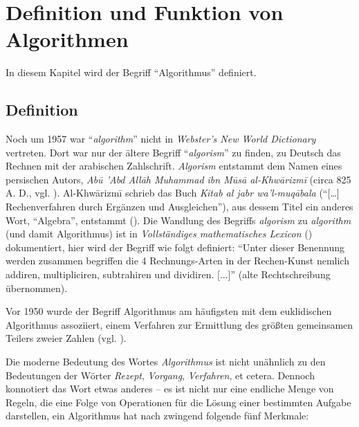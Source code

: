 \chapter{Definition und Funktion von Algorithmen}

In diesem Kapitel wird der Begriff \enquote{Algorithmus} definiert.

\section{Definition}
\label{sec:algorithm-definition}

Noch um 1957 war \enquote{\emph{algorithm}} nicht in \emph{Webster's New World Dictionary} vertreten. Dort war nur der ältere Begriff \enquote{\emph{algorism}} zu finden, zu Deutsch das Rechnen mit der arabischen Zahlschrift. \emph{Algorism} entstammt dem Namen eines persischen Autors, \emph{Abū 'Abd Allāh Muhammad ibn Mūsā al-Khwārizmī} \footnotemark (circa 825 A. D., vgl. \cite[1--2]{taocp1}). Al-Khwārizmī schrieb das Buch \emph{Kitab al jabr wa'l-muqābala} (\enquote{[\ldots] Rechenverfahren durch Ergänzen und Ausgleichen}), aus dessem Titel ein anderes Wort, \enquote{Algebra}, entstammt (\cite[197--199]{ger1984}). Die Wandlung des Begriffs \emph{algorism} zu \emph{algorithm} (und damit Algorithmus) ist in \emph{Vollständiges mathematisches Lexicon} (\cite[38]{wol1747}) dokumentiert, hier wird der Begriff wie folgt definiert: \enquote{Unter dieser Benennung werden zusammen begriffen die 4 Rechnungs-Arten in der Rechen-Kunst nemlich addiren, multipliciren, subtrahiren und dividiren. [...]} (alte Rechtschreibung übernommen).


Vor 1950 wurde der Begriff Algorithmus am häufigsten mit dem euklidischen Algorithmus assoziiert, einem Verfahren zur Ermittlung des größten gemeinsamen Teilers zweier Zahlen (vgl. \cite[2]{taocp1}).

Die moderne Bedeutung des Wortes \emph{Algorithmus} ist nicht unähnlich zu den Bedeutungen der Wörter \emph{Rezept}, \emph{Vorgang}, \emph{Verfahren}, et cetera. Dennoch konnotiert das Wort etwas anderes -- es ist nicht nur eine endliche Menge von Regeln, die eine Folge von Operationen für die Lösung einer bestimmten Aufgabe darstellen, ein Algorithmus hat nach \cite[1]{hsr1997} zwingend folgende fünf Merkmale:

